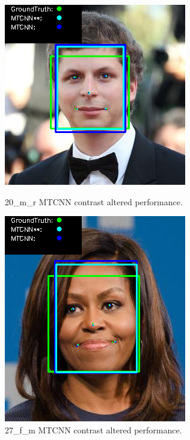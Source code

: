 \documentclass{l4proj}
\begin{document}
\begin{appendices}
\begin{figure}[h!]
  \centering
  \begin{minipage}{0.49\textwidth}
    \centering
     \includegraphics[width=\textwidth]{images/mtcnn/20.png}
    \caption{20\_m\_r MTCNN contrast altered performance.}
    \label{whoopi_result}
  \end{minipage}
    \hfill
    \begin{minipage}{0.49\textwidth}
    \centering
     \includegraphics[width=\textwidth]{images/mtcnn/27.png}
    \caption{27\_f\_m MTCNN contrast altered performance.}
    \label{whoopi_result}
  \end{minipage}
\end{figure}


\end{appendices}
\end{document}
